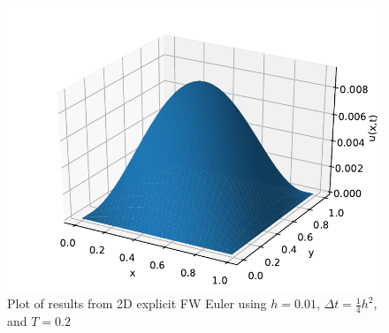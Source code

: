 \documentclass[%
oneside,                 %
final,                   %
10pt]{article}
\begin{document}
\begin{figure}[!htb]
        \centering 
         \includegraphics[scale=.7]{../Results/2dnumerical.pdf} 
        \caption{Plot of results from 2D explicit FW Euler using $h=0.01$, $\Delta t=\frac{1}{4} h^2$, and $T=0.2$}
        \label{fig:2dnumerical}   
\end{figure}  







\end{document}
